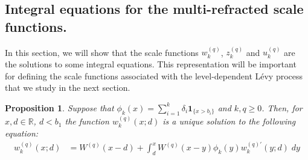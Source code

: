 \documentclass[12pt,reqno]{amsart}
\newtheorem{prop}[theorem]{Proposition}
\theoremstyle{definition}
\theoremstyle{remark}
\newcommand{\e}{\mathbb{E}}
\newcommand{\ind}{\mathbf{1}}
\begin{document}






 


	

\subsection{Integral equations for the multi-refracted scale functions.}\label{ss.integral}
In this section, we will show that the scale functions $w_k^{(q)}$, $z_k^{(q)}$ and $u_k^{(q)}$  are the solutions to some integral equations.
This representation will be important for defining the scale functions associated with the level-dependent L\'evy
process that we study in the next section. 
\begin{prop}\label{Volterra_type}
  Suppose that $\phi_k(x)=\sum_{i=1}^k\delta_i\ind_{\{x>b_i\}}$ and $k,q\ge0$.
  Then, for $x,d\in\mathbb{R}$, $d < b_1$ the function $w_k^{(q)}(x;d)$ is a unique solution to the following equation: %
\begin{align}\label{eq:volterra.wk}
w_k^{(q)}(x;d)&=W^{(q)}(x-d)+\int_d^xW^{(q)}(x-y)\phi_k(y)w_k^{(q)\prime}(y;d)\;dy
\end{align}
\end{prop}
\end{document}
